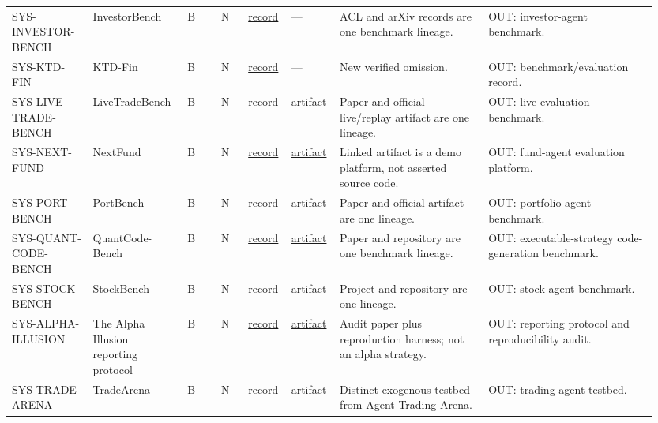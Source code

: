 \begin{longtable}{@{}L{0.12\linewidth}L{0.14\linewidth}L{0.05\linewidth}L{0.04\linewidth}L{0.06\linewidth}L{0.07\linewidth}L{0.22\linewidth}L{0.25\linewidth}@{}}
SYS-\allowbreak{}INVESTOR-\allowbreak{}BENCH & InvestorBench & B & N & \href{https://aclanthology.org/2025.acl-long.126/}{record} & --- & ACL and arXiv records are one benchmark lineage. & OUT: investor-agent benchmark. \\
SYS-\allowbreak{}KTD-\allowbreak{}FIN & KTD-Fin & B & N & \href{https://arxiv.org/abs/2605.28359}{record} & --- & New verified omission. & OUT: benchmark/evaluation record. \\
SYS-\allowbreak{}LIVE-\allowbreak{}TRADE-\allowbreak{}BENCH & LiveTradeBench & B & N & \href{https://arxiv.org/abs/2511.03628}{record} & \href{https://github.com/ulab-uiuc/live-trade-bench}{artifact} & Paper and official live/replay artifact are one lineage. & OUT: live evaluation benchmark. \\
SYS-\allowbreak{}NEXT-\allowbreak{}FUND & NextFund & B & N & \href{https://arxiv.org/abs/2607.11141}{record} & \href{https://paradoox.cn/nextfund/}{artifact} & Linked artifact is a demo platform, not asserted source code. & OUT: fund-agent evaluation platform. \\
SYS-\allowbreak{}PORT-\allowbreak{}BENCH & PortBench & B & N & \href{https://arxiv.org/abs/2605.27887}{record} & \href{https://github.com/AgenticFinLab/portbench}{artifact} & Paper and official artifact are one lineage. & OUT: portfolio-agent benchmark. \\
SYS-\allowbreak{}QUANT-\allowbreak{}CODE-\allowbreak{}BENCH & QuantCode-Bench & B & N & \href{https://arxiv.org/abs/2604.15151}{record} & \href{https://github.com/LimexAILab/QuantCode-Bench}{artifact} & Paper and repository are one benchmark lineage. & OUT: executable-strategy code-generation benchmark. \\
SYS-\allowbreak{}STOCK-\allowbreak{}BENCH & StockBench & B & N & \href{https://arxiv.org/abs/2510.02209}{record} & \href{https://github.com/ChenYXxxx/stockbench}{artifact} & Project and repository are one lineage. & OUT: stock-agent benchmark. \\
SYS-\allowbreak{}ALPHA-\allowbreak{}ILLUSION & The Alpha Illusion reporting protocol & B & N & \href{https://arxiv.org/abs/2605.16895}{record} & \href{https://github.com/hj1650782738/Trading}{artifact} & Audit paper plus reproduction harness; not an alpha strategy. & OUT: reporting protocol and reproducibility audit. \\
SYS-\allowbreak{}TRADE-\allowbreak{}ARENA & TradeArena & B & N & \href{https://arxiv.org/abs/2605.28850}{record} & \href{https://github.com/weich97/TradeArena}{artifact} & Distinct exogenous testbed from Agent Trading Arena. & OUT: trading-agent testbed. \\

\end{longtable}
